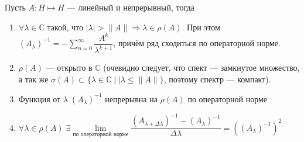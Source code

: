 \documentclass[14pt]{extarticle}
\begin{document}
\begin{Theor}
    Пусть $A : H \mapsto H$ --- линейный и непрерывный, тогда
    \begin{enumerate}
        \item{$\forall \lambda \in \mathbb C$ такой, что $|\lambda| > \|A\| \Rightarrow \lambda \in \rho(A)$.
            При этом $(A_\lambda)^{-1} = -\sum \limits_{n = 0}^{\infty}\dfrac{A^k}{\lambda^{k+1}}$, причём ряд сходиться по операторной норме.}
        \item{$\rho(A)$ --- открыто в $\mathbb C$ (очевидно следует, что спект --- замкнутое множество, а так же $\sigma(A) \subset \{ \lambda \in \mathbb C \mid |\lambda
            \le \|A\|\}$, поэтому спектр --- компакт).}
        \item{Функция от $\lambda\;(A_\lambda)^{-1}$ непрерывна на $\rho(A)$ по операторной норме}
        \item{$\forall \lambda \in \rho(A)\;\exists \lim\limits_{\text{по операторной норме}}\dfrac{(A_{\lambda + \Delta \lambda})^{-1} - (A_\lambda)^{-1}}{\Delta\lambda} =
            ((A_\lambda)^{-1})^2$}
    \end{enumerate}
\end{Theor}
\end{document}
